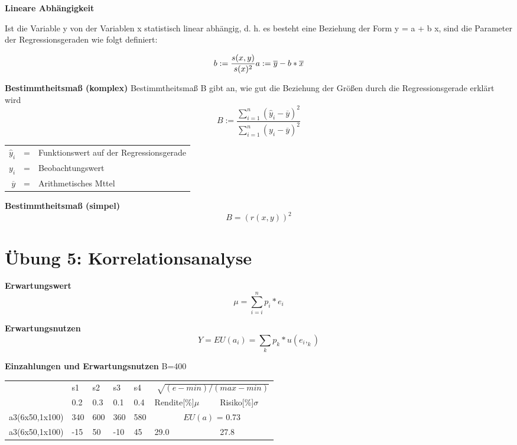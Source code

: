 \documentclass[11pt,twocolumn,fleqn]{article}
\begin{document}
\textbf{Lineare Abhängigkeit}

Ist die Variable y von der Variablen x statistisch linear abhängig, d. h. es besteht eine Beziehung der Form y = a + b x, sind die Parameter der Regressionsgeraden wie folgt definiert: 

\begin{equation*}
b:=\frac{s(x,y)}{s(x)^2}\\
a:=\overline{y}-b*\overline{x}
\end{equation*}

\textbf{Bestimmtheitsmaß (komplex)}
Bestimmtheitsmaß B gibt an, wie gut die Beziehung der Größen durch die Regressionsgerade erklärt wird
\begin{equation*}
B:=\frac{ \sum^n_{i=1}(\widehat{y}_i-\overline{y})^2 }{ \sum^n_{i=1}(y_i-\overline{y})^2 }
\end{equation*}
\begin{center}\begin{tabular}{rcl}
   $\widehat{y}_i$ & = & Funktionswert auf der Regressionsgerade \\
   $y_i$ & = & Beobachtungswert \\
   $\overline{y}$ & = & Arithmetisches Mttel \\
\end{tabular}\end{center}

\textbf{Bestimmtheitsmaß (simpel)}
\begin{equation*}
B=(r(x,y))^2
\end{equation*}




\section{Übung 5: Korrelationsanalyse}
\textbf{Erwartungswert}
\begin{equation*}
\mu = \sum^n_{i=i}p_i*e_i
\end{equation*}

\textbf{Erwartungsnutzen}
\begin{equation*}
Y=EU(a_i)=\sum_kp_k*u(e_i,_k)
\end{equation*}


\textbf{Einzahlungen und Erwartungsnutzen}
B=400
\begin{center}
    \begin{tabular}{ l | l | l | l | l | l l}
                   & s1  & s2  & s3  & s4 & \multicolumn{2}{c}{$ \sqrt[]{(e-min)/(max-min)} $}  \\
                   & 0.2 & 0.3 & 0.1 & 0.4 & Rendite[\%]$\mu$ & Risiko[\%]$\sigma$ \\ \hline
    a3(6x50,1x100) & 340 & 600 & 360 & 580 & \multicolumn{2}{c}{$EU(a)$ = 0.73} \\ \hline                   
    a3(6x50,1x100) & -15 & 50 & -10 & 45 & 29.0  & 27.8 \\ \hline
    \end{tabular}
\end{center}
\end{document}
